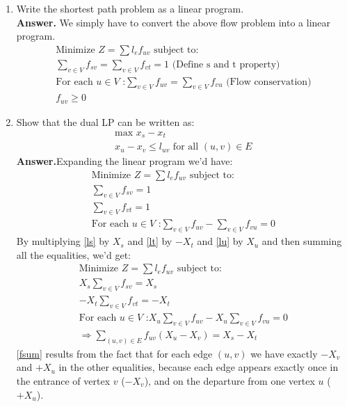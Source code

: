 \documentclass[letterpaper,12pt]{article}
\begin{document}
\begin{enumerate}
\begin{enumerate}
	\item Write the shortest path problem as a linear program.\\
	\textbf{Answer.} We simply have to convert the above flow problem into a linear program.\\
	\begin{gather}
		\text{Minimize } Z = \sum l_ef_{uv}  \text{ subject to:}\\
		\sum_{v \in V} f_{sv} = \sum_{v \in V} f_{vt} = 1 \text{ (Define s and t property)}\\
		\text{For each $u \in{} V$ :} \sum_{v \in V} f_{uv} = \sum_{v \in V} f_{vu} \text{ (Flow conservation)}\\
		f_{uv} \geq 0
	\end{gather}
	\item Show that the dual LP can be written as:
	\begin{gather*}
		\text{max }x_s - x_t\\
		x_u - x_v \leq l_{uv}\text{ for all }(u, v) \in E
	\end{gather*}
	\textbf{Answer.}Expanding the linear program we'd have:
	\begin{gather}
		\text{Minimize } Z = \sum l_ef_{uv}  \text{ subject to:}\\
		\sum_{v \in V} f_{sv} = 1 \label{ls} \\
		\sum_{v \in V} f_{vt} = 1 \label{lt} \\
		\text{For each $u \in{} V$ :} \sum_{v \in V} f_{uv} - \sum_{v \in V} f_{vu} = 0  \label{lu}
	\end{gather}
	By multiplying \ref{ls} by $X_s$ and \ref{lt} by $-X_t$ and \ref{lu} by $X_u$ and then summing all the equalities, we'd get:
	\begin{gather}
		\text{Minimize } Z = \sum l_ef_{uv}  \text{ subject to:}\\
		X_s \sum_{v \in V} f_{sv} = X_s\\
		-X_t \sum_{v \in V} f_{vt} = -X_t\\
		\text{For each $u \in{} V$ :} X_u \sum_{v \in V} f_{uv} - X_u \sum_{v \in V} f_{vu} = 0\\
		\Rightarrow \sum_{(u, v)\in E} f_{uv}(X_u - X_v) = X_s - X_t \label{fsum}
	\end{gather}
	\ref{fsum} results from the fact that for each edge $(u, v)$ we have exactly $-X_v$ and $+X_u$ in the other equalities, because each edge appears exactly once in the entrance of vertex $v$ ($-X_v$), and on the departure from one vertex $u$ ($+X_u$).\\

\end{enumerate}
\end{enumerate}
\end{document}
